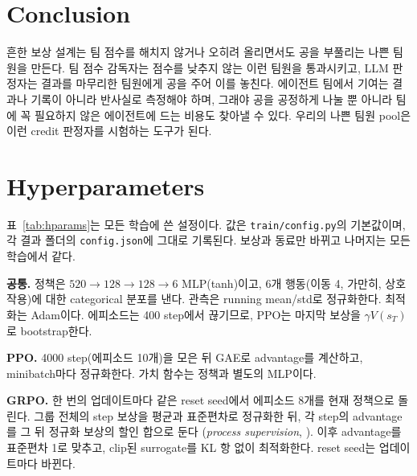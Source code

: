 \documentclass[letterpaper]{article} %
\begin{document}
\section{Conclusion}
흔한 보상 설계는 팀 점수를 해치지 않거나 오히려 올리면서도 공을 부풀리는 나쁜 팀원을 만든다. 팀 점수
감독자는 점수를 낮추지 않는 이런 팀원을 통과시키고, LLM 판정자는 결과를 마무리한 팀원에게 공을 주어 이를
놓친다. 에이전트 팀에서 기여는 결과나 기록이 아니라 반사실로 측정해야 하며, 그래야 공을 공정하게 나눌 뿐
아니라 팀에 꼭 필요하지 않은 에이전트에 드는 비용도 찾아낼 수 있다. 우리의 나쁜 팀원 pool은 이런 credit
판정자를 시험하는 도구가 된다.



\appendix
\section{Hyperparameters}
표~\ref{tab:hparams}는 모든 학습에 쓴 설정이다. 값은 \texttt{train/config.py}의 기본값이며, 각 결과 폴더의
\texttt{config.json}에 그대로 기록된다. 보상과 동료만 바뀌고 나머지는 모든 학습에서 같다.

\textbf{공통.} 정책은 $520 \rightarrow 128 \rightarrow 128 \rightarrow 6$ MLP(tanh)이고, 6개 행동(이동 4,
가만히, 상호작용)에 대한 categorical 분포를 낸다. 관측은 running mean/std로 정규화한다. 최적화는 Adam이다.
에피소드는 400 step에서 끊기므로, PPO는 마지막 보상을 $\gamma V(s_T)$로 bootstrap한다.

\textbf{PPO.} 4000 step(에피소드 10개)을 모은 뒤 GAE로 advantage를 계산하고, minibatch마다 정규화한다. 가치 함수는
정책과 별도의 MLP이다.

\textbf{GRPO.} 한 번의 업데이트마다 같은 reset seed에서 에피소드 8개를 현재 정책으로 돌린다. 그룹 전체의 step
보상을 평균과 표준편차로 정규화한 뒤, 각 step의 advantage를 그 뒤 정규화 보상의 할인 합으로 둔다
(\emph{process supervision}, \citealt{shao2024deepseekmath}). 이후 advantage를 표준편차 1로 맞추고, clip된
surrogate를 KL 항 없이 최적화한다. reset seed는 업데이트마다 바뀐다.
\end{document}
